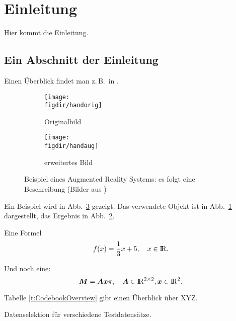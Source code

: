 \section{Einleitung}
\label{s:intro}

Hier kommt die Einleitung.


\subsection{Ein Abschnitt der Einleitung}
\label{ss:intro:abc}

Einen Überblick findet man z.\,B.\ in \cite{Auer00:HTF}.

\begin{figure}[t]
\centering

\begin{subfigure}{0.45\linewidth}
\centering
\texttt{[image: \\figdir/handorig]}
\caption{Originalbild}
\label{FIG:arexorig}
\end{subfigure}
%
\begin{subfigure}{0.45\linewidth}
\centering
\texttt{[image: \\figdir/handaug]}
\caption{erweitertes Bild}
\label{FIG:arexaugm}
\end{subfigure}
%
\caption[AR Beispiel]
{Beispiel eines Augmented Reality Systems: es folgt eine Beschreibung (Bilder aus \cite{Schmidt01:PAO})}
\label{FIG:arex}
\end{figure}

Ein Beispiel wird in Abb.\ \ref{FIG:arex} gezeigt.
Das verwendete Objekt ist in Abb.\ \ref{FIG:arexorig} dargestellt, das Ergebnis in Abb.\ \ref{FIG:arexaugm}.

Eine Formel
\begin{equation}
\label{eq:cvp:test}
f(x) = \frac{1}{3} x + 5, \quad x \in \mathord{\mathrm{I\!R}}.
\end{equation}

Und noch eine:
\begin{equation}
\label{eq:cvp:matvec}
\bm{M}  = \bm{Ax} \pi, \quad \bm{A} \in \mathord{\mathrm{I\!R}}^{2 \times 2}, \bm{x} \in \mathord{\mathrm{I\!R}}^2.
\end{equation}

Tabelle \ref{t:CodebookOverview} gibt einen Überblick über XYZ.

\begin{table}[t]
\centering\small

 \caption[Testtabelle]{Datenselektion für verschiedene Testdatensätze.}
  \label{t:CodebookOverview}
\end{table}

